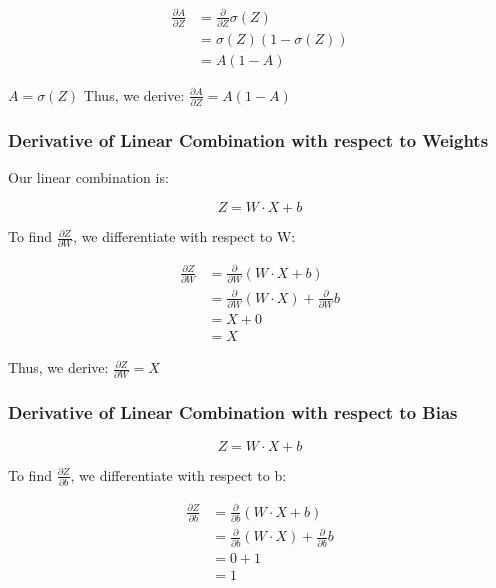 \documentclass{article}
\begin{document}
\begin{align}
    \frac{\partial A}{\partial Z} &= \frac{\partial}{\partial Z} \sigma(Z) \\
    &= \sigma(Z)(1 - \sigma(Z)) \\
    &= A(1 - A)
\end{align}

$A = \sigma(Z)$ Thus, we derive: $\frac{\partial A}{\partial Z} = A(1 - A)$

\subsubsection{Derivative of Linear Combination with respect to Weights}

Our linear combination is:

\begin{equation}
    Z = W \cdot X + b
\end{equation}

To find $\frac{\partial Z}{\partial W}$, we differentiate with respect to W:

\begin{align}
    \frac{\partial Z}{\partial W} &= \frac{\partial}{\partial W} (W \cdot X + b) \\
    &= \frac{\partial}{\partial W} (W \cdot X) + \frac{\partial}{\partial W} b \\
    &= X + 0 \\
    &= X
\end{align}

Thus, we derive: $\frac{\partial Z}{\partial W} = X$

\subsubsection{Derivative of Linear Combination with respect to Bias}

\begin{equation}
    Z = W \cdot X + b
\end{equation}

To find $\frac{\partial Z}{\partial b}$, we differentiate with respect to b:

\begin{align}
    \frac{\partial Z}{\partial b} &= \frac{\partial}{\partial b} (W \cdot X + b) \\
    &= \frac{\partial}{\partial b} (W \cdot X) + \frac{\partial}{\partial b} b \\
    &= 0 + 1 \\
    &= 1
\end{align}
\end{document}
